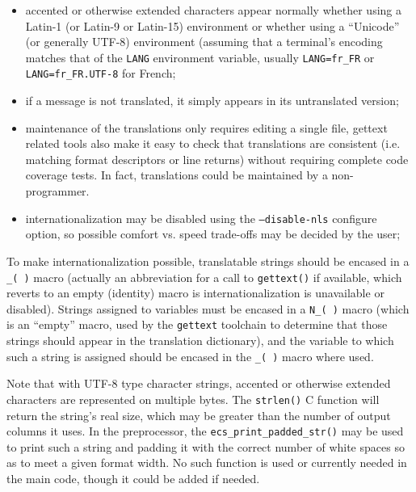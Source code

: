 \begin{itemize}

\item accented or otherwise extended characters appear normally whether
  using a Latin-1 (or Latin-9 or Latin-15) environment or whether
  using a ``Unicode'' (or generally UTF-8) environment (assuming
  that a terminal's encoding matches that of the {\tt LANG} environment
  variable, usually {\tt LANG=fr\_FR} or {\tt LANG=fr\_FR.UTF-8}
  for French;

\item if a message is not translated, it simply appears in its
  untranslated version;

\item maintenance of the translations only requires editing a single
  file, gettext related tools also make it easy to check that
  translations are consistent (i.e. matching format descriptors
  or line returns) without requiring complete code coverage tests.
  In fact, translations could be maintained by a non-programmer.

\item internationalization may be disabled using the
 {\tt --disable-nls} configure option, so possible comfort vs. speed
 trade-offs may be decided by the user;

\end{itemize}

To make internationalization possible, translatable strings should be
encased in a {\tt\_( )} macro (actually an abbreviation for a call
to {\tt gettext()} if available, which reverts to an empty (identity)
macro is internationalization is unavailable or disabled).
Strings assigned to variables must be encased in a {\tt N\_( )}
macro (which is an ``empty'' macro, used by the {\tt gettext} toolchain
to determine that those strings should appear in the translation dictionary),
and the variable to which such a string is assigned should be
encased in the {\tt\_( )} macro where used.

Note that with UTF-8 type character strings, accented or otherwise
extended characters are represented on multiple bytes. The {\tt strlen()}
C function will return the string's real size, which may be greater
than the number of output columns it uses. In the preprocessor, the
{\tt ecs\_print\_padded\_str()} may be used to print such a string
and padding it with the correct number of white spaces so as to meet
a given format width. No such function is used or currently needed in the
main code, though it could be added if needed.

